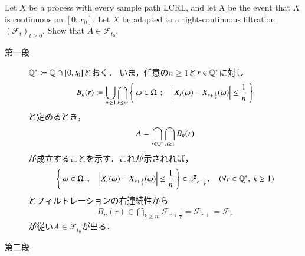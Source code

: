 \begin{screen}
	\begin{thm}
		Let $X$ be a process with every sample path LCRL, and 
		let A be the event that $X$ is continuous on $[0,x_0]$.
		Let $X$ be adapted to a right-continuous filtration 
		$(\mathscr{F}_t)_{t \geq 0}$. Show that $A \in \mathscr{F}_{t_0}$.
	\end{thm}
\end{screen}

\begin{prf}\mbox{}
	\begin{description}
		\item[第一段]
			$\mathbb{Q}^* \coloneqq \mathbb{Q} \cap [0,t_0]$とおく．
			いま，任意の$n \geq 1$と$r \in \mathbb{Q}^*$に対し
			\begin{align}
				B_n (r) \coloneqq
				\bigcup_{m \geq 1} \bigcap_{k \leq m} 
				\left\{\ \omega \in \Omega\ \, ; \quad \left| X_r(\omega)-X_{r+\frac{1}{k}}(\omega) \right| \leq \frac{1}{n}\ \right\}
			\end{align}
			と定めるとき，
			\begin{align}
				A = \bigcap_{r \in \mathbb{Q}^*} \bigcap_{n \geq 1} B_n(r)
			\end{align}
			が成立することを示す．これが示されれば，
			\begin{align}
				\left\{\ \omega \in \Omega\ \, ; \quad \left| X_r(\omega)-X_{r+\frac{1}{k}}(\omega) \right| \leq \frac{1}{n}\ \right\}
				\in \mathscr{F}_{r+\frac{1}{k}},
				\quad (\forall r \in \mathbb{Q}^*,\ k \geq 1)
			\end{align}
			とフィルトレーションの右連続性から
			\begin{align}
				B_n (r) \in \bigcap_{k \geq m} \mathscr{F}_{r+\frac{1}{k}} = \mathscr{F}_{r+} = \mathscr{F}_{r}
			\end{align}
			が従い$A \in \mathscr{F}_{t_0}$が出る．
		
		\item[第二段]
			
	\end{description}
\end{prf}

\begin{screen}
\end{screen}

